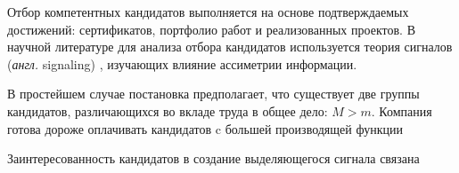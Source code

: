 Отбор компетентных кандидатов выполняется на основе подтверждаемых достижений: сертификатов, портфолио работ и реализованных проектов.
В научной литературе для анализа отбора кандидатов используется теория сигналов (\textit{англ.} signaling) \cite{spence1978job}, изучающих влияние ассиметрии информации.

В простейшем случае постановка предполагает, что существует две группы кандидатов, различающихся во вкладе труда в общее дело:
$M > m$. Компания готова дороже оплачивать кандидатов c большей производящей функции 

Заинтересованность кандидатов в создание выделяющегося сигнала связана